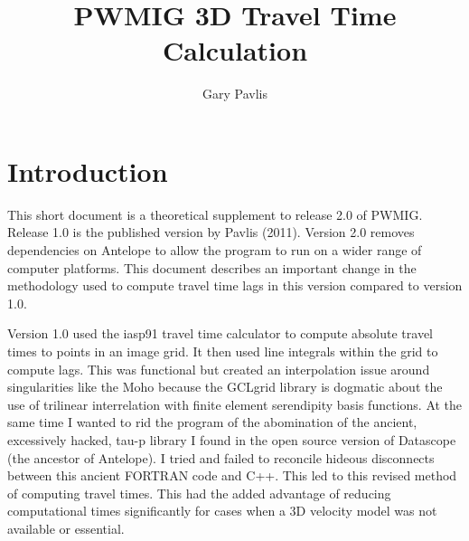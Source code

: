 \documentclass[12pt]{amsart}
\title{PWMIG 3D Travel Time Calculation}
\author{Gary Pavlis}
\date{} %
\begin{document}
\maketitle

\section{Introduction}
This short document is a theoretical supplement to release 2.0 of PWMIG.   Release 1.0 is the published version by Pavlis (2011).   Version 2.0 removes dependencies on Antelope to allow the program to run on a wider range of computer platforms.   This document describes an important 
change in the methodology used to compute travel time lags in this version compared to version 1.0.

Version 1.0 used the iasp91 travel time calculator to compute absolute travel times to points in 
an image grid.   It then used line integrals within the grid to compute lags.   This was functional but
created an interpolation issue around singularities like the Moho because the GCLgrid library is
dogmatic about the use of trilinear interrelation with finite element serendipity basis functions.   At the same time I wanted to rid the program of the abomination of the ancient, excessively hacked, tau-p library I found in the open source version of Datascope (the ancestor of Antelope).  I tried and failed to reconcile hideous disconnects between this ancient FORTRAN code and C++.   This led to this 
revised method of computing travel times.   This had the added advantage of reducing computational times significantly for
cases when a 3D velocity model was not available or essential. 
\end{document}
